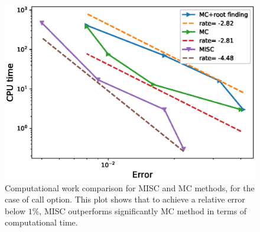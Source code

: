 \FloatBarrier
	\begin{figure}[h!]
\centering
\includegraphics[width=0.4\linewidth]{./figures/Call_Complexity_rates/error_vs_time}

\caption{Computational work comparison for MISC and MC methods, for the case of  call option. This plot shows that to achieve a relative error below $1\%$, MISC outperforms significantly MC method in terms of computational time.}
\label{fig:Complexity plot for MC and MISC , Call non rich}
\end{figure}


\FloatBarrier

